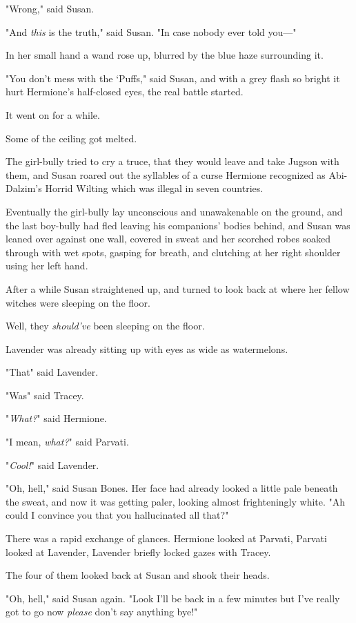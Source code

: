 "Wrong," said Susan.

"And \emph{this} is the truth," said Susan. "In case nobody ever told you—"

In her small hand a wand rose up, blurred by the blue haze surrounding it.

"You don't mess with the `Puffs," said Susan, and with a grey flash so bright
it hurt Hermione's half-closed eyes, the real battle started.

It went on for a while.

Some of the ceiling got melted.

The girl-bully tried to cry a truce, that they would leave and take Jugson with
them, and Susan roared out the syllables of a curse Hermione recognized as
Abi-Dalzim's Horrid Wilting which was illegal in seven countries.

Eventually the girl-bully lay unconscious and unawakenable on the ground, and
the last boy-bully had fled leaving his companions' bodies behind, and Susan
was leaned over against one wall, covered in sweat and her scorched robes
soaked through with wet spots, gasping for breath, and clutching at her right
shoulder using her left hand.

After a while Susan straightened up, and turned to look back at where her
fellow witches were sleeping on the floor.

Well, they \emph{should've} been sleeping on the floor.

Lavender was already sitting up with eyes as wide as watermelons.

"That{\el}" said Lavender.

"Was{\el}" said Tracey.

"\emph{What?}" said Hermione.

"I mean, \emph{what?}" said Parvati.

"\emph{Cool!}" said Lavender.

"Oh, hell," said Susan Bones. Her face had already looked a little pale beneath
the sweat, and now it was getting paler, looking almost frighteningly white.
"Ah{\el} could I convince you that you hallucinated all that?"

There was a rapid exchange of glances. Hermione looked at Parvati, Parvati
looked at Lavender, Lavender briefly locked gazes with Tracey.

The four of them looked back at Susan and shook their heads.

"Oh, hell," said Susan again. "Look I'll be back in a few minutes but I've
really got to go now \emph{please} don't say anything bye!"

